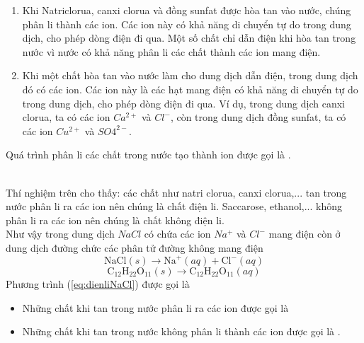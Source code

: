 \begin{hoivadap}
{\begin{enumerate}[(1)]
			\item Khi Natriclorua, canxi clorua và đồng sunfat được hòa tan vào nước, chúng phân li thành các ion. Các ion này có khả năng di chuyển tự do trong dung dịch, cho phép dòng điện đi qua. Một số chất chỉ dẫn điện khi hòa tan trong nước vì nước có khả năng phân li các chất thành các ion mang điện.
			\item Khi một chất hòa tan vào nước làm cho dung dịch dẫn điện, trong dung dịch đó có các ion. Các ion này là các hạt mang điện có khả năng di chuyển tự do trong dung dịch, cho phép dòng điện đi qua. Ví dụ, trong dung dịch canxi clorua, ta có các ion $Ca^{2+}$ và $Cl^-$, còn trong dung dịch đồng sunfat, ta có các ion $Cu^{2+}$ và $SO4^{2-}$.
		\end{enumerate}}
\end{hoivadap}
\begin{tomtat}
	Quá trình phân li các chất trong nước tạo thành ion được gọi là .
\end{tomtat}
\\
Thí nghiệm trên cho thấy: các chất như natri clorua, canxi clorua,... tan trong nước phân li ra các ion nên chúng là chất điện li. Saccarose, ethanol,... không phân li ra các ion nên chúng là chất không điện li.
\\
Như vậy trong dung dịch $NaCl$ có chứa các ion $Na^+$ và $Cl^-$ mang điện còn ở dung dịch đường chức các phân tử đường không mang điện
\begin{equation}\label{eq:dienliNaCl}
	\mathrm{NaCl}(s) \rightarrow \mathrm{Na}^{+}(a q)+\mathrm{Cl}^{-}(a q)
\end{equation}
\begin{equation}
	\mathrm{C}_{12} \mathrm{H}_{22} \mathrm{O}_{11}(s) \rightarrow \mathrm{C}_{12} \mathrm{H}_{22} \mathrm{O}_{11}(a q)
\end{equation}
Phương trình (\ref{eq:dienliNaCl}) được gọi là 
\vspace{0.25cm}
\begin{tomtat}
	 \begin{itemize}
	 	\item Những chất khi tan trong nước phân li ra các ion được gọi là 
	 	\item Những chất khi tan trong nước không phân li thành các ion được gọi là  .
	 \end{itemize}
\end{tomtat}
